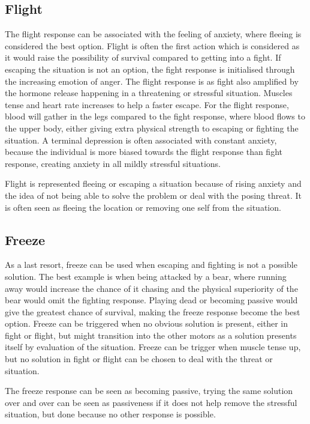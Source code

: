 \subsection{Flight}
The flight response can be associated with the feeling of anxiety, where fleeing is considered the best option. Flight is often the first action which is considered as it would raise the possibility of survival compared to getting into a fight. If escaping the situation is not an option, the fight response is initialised through the increasing emotion of anger. The flight response is as fight also amplified by the hormone release happening in a threatening or stressful situation. Muscles tense and heart rate increases to help a faster escape. For the flight response, blood will gather in the legs compared to the fight response, where blood flows to the upper body, either giving extra physical strength to escaping or fighting the situation. A terminal depression is often associated with constant anxiety, because the individual is more biased towards the flight response than fight response, creating anxiety in all mildly stressful situations.

Flight is represented fleeing or escaping a situation because of rising anxiety and the idea of not being able to solve the problem or deal with the posing threat. It is often seen as fleeing the location or removing one self from the situation.

\subsection{Freeze}
As a last resort, freeze can be used when escaping and fighting is not a possible solution. The best example is when being attacked by a bear, where running away would increase the chance of it chasing and the physical superiority of the bear would omit the fighting response. Playing dead or becoming passive would give the greatest chance of survival, making the freeze response become the best option. Freeze can be triggered when no obvious solution is present, either in fight or flight, but might transition into the other motors as a solution presents itself by evaluation of the situation. Freeze can be trigger when muscle tense up, but no solution in fight or flight can be chosen to deal with the threat or situation.

The freeze response can be seen as becoming passive, trying the same solution over and over can be seen as passiveness if it does not help remove the stressful situation, but done because no other response is possible.

